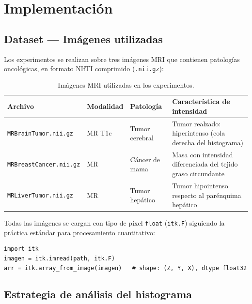 \documentclass[12pt, a4paper]{article}
\begin{document}
\section{Implementación}
\label{sec:implementacion}

\subsection{Dataset — Imágenes utilizadas}

Los experimentos se realizan sobre tres imágenes MRI que contienen patologías oncológicas,
en formato NIfTI comprimido (\texttt{.nii.gz}):

\begin{table}[H]
\centering
\renewcommand{\arraystretch}{1.3}
\begin{tabularx}{\textwidth}{llXl}
\toprule
\textbf{Archivo} & \textbf{Modalidad} & \textbf{Patología} & \textbf{Característica de intensidad} \\
\midrule
\texttt{MRBrainTumor.nii.gz}   & MR T1c & Tumor cerebral  & Tumor realzado: hiperintenso (cola derecha del histograma) \\
\texttt{MRBreastCancer.nii.gz} & MR     & Cáncer de mama  & Masa con intensidad diferenciada del tejido graso circundante \\
\texttt{MRLiverTumor.nii.gz}   & MR     & Tumor hepático  & Tumor hipointenso respecto al parénquima hepático \\
\bottomrule
\end{tabularx}
\caption{Imágenes MRI utilizadas en los experimentos.}
\label{tab:dataset}
\end{table}

Todas las imágenes se cargan con tipo de pixel \texttt{float} (\texttt{itk.F}) siguiendo
la práctica estándar para procesamiento cuantitativo:

\begin{lstlisting}[caption={Carga de imagen con pixel type float}]
import itk
imagen = itk.imread(path, itk.F)
arr = itk.array_from_image(imagen)   # shape: (Z, Y, X), dtype float32
\end{lstlisting}

\subsection{Estrategia de análisis del histograma}
\end{document}
